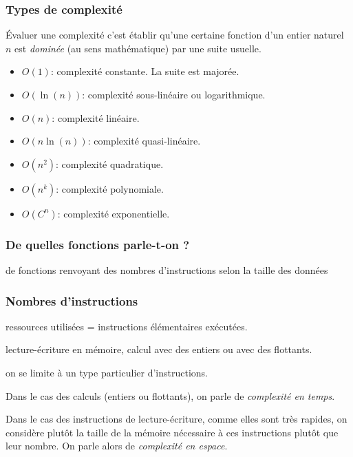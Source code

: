 


\begin{frame}
  \frametitle{Types de complexité}
\'Evaluer une complexité c'est établir qu'une certaine fonction d'un entier naturel $n$ est \emph{dominée} (au sens mathématique) par une suite usuelle.
\begin{itemize}
  \item $O(1)$: complexité constante. La suite est majorée. 
  \item $O(\ln(n))$: complexité sous-linéaire ou logarithmique.
  \item $O(n)$: complexité linéaire.
  \item $O(n\ln(n))$: complexité quasi-linéaire.
  \item $O(n^2)$: complexité quadratique.
  \item $O(n^k)$: complexité polynomiale.
  \item $O(C^n)$: complexité exponentielle.
\end{itemize}
\end{frame}

\begin{frame}
  \frametitle{De quelles fonctions parle-t-on ?}
de fonctions renvoyant des nombres d'instructions selon la taille des données  
\end{frame}

\begin{frame}
  \frametitle{Nombres d'instructions}
ressources utilisées = instructions élémentaires exécutées.

lecture-écriture en mémoire, calcul avec des entiers ou avec des flottants.

on se limite à un type particulier d'instructions.

Dans le cas des calculs (entiers ou flottants), on parle de \emph{complexité en temps}.

Dans le cas des instructions de lecture-écriture, comme elles sont très rapides, on considère plutôt la taille de la mémoire nécessaire à ces instructions plutôt que leur nombre. On parle alors de \emph{complexité en espace}.
\end{frame}

